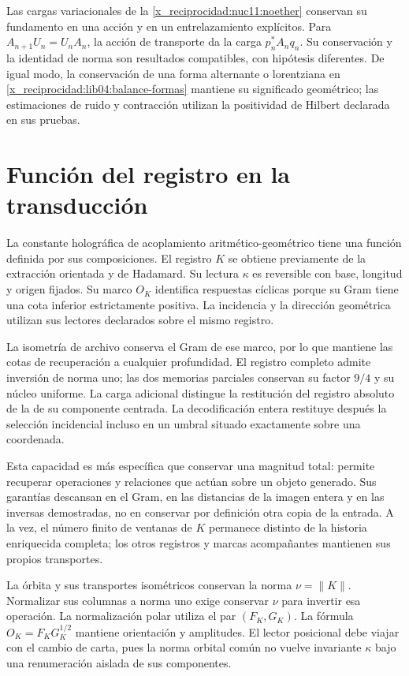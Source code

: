 Las cargas variacionales de la \cref{x_reciprocidad:nuc11:noether} conservan su
fundamento en una acción y en un entrelazamiento explícitos. Para
\(A_{n+1}U_n=U_nA_n\), la acción de transporte da la carga
\(p_n^*A_nq_n\). Su conservación y la identidad de norma son
resultados compatibles, con hipótesis diferentes. De igual modo,
la conservación de una forma alternante o lorentziana en
\eqref{x_reciprocidad:lib04:balance-formas} mantiene su significado geométrico;
las estimaciones de ruido y contracción utilizan la positividad
de Hilbert declarada en sus pruebas.

\section{Función del registro en la transducción}
\label{x_reciprocidad:lib06:registro}

La constante holográfica de acoplamiento aritmético-geométrico tiene
una función definida por sus composiciones. El registro \(K\)
se obtiene previamente de la extracción orientada y de Hadamard.
Su lectura \(\kappa\) es reversible con base, longitud y origen
fijados. Su marco \(O_K\) identifica respuestas cíclicas porque
su Gram tiene una cota inferior estrictamente positiva. La
incidencia y la dirección geométrica utilizan sus lectores
declarados sobre el mismo registro.

La isometría de archivo conserva el Gram de ese marco, por lo que
mantiene las cotas de recuperación a cualquier profundidad. El
registro completo admite inversión de norma uno; las dos memorias
parciales conservan su factor \(9/4\) y su núcleo uniforme. La
carga adicional distingue la restitución del registro absoluto de
la de su componente centrada. La decodificación entera restituye
después la selección incidencial incluso en un umbral situado
exactamente sobre una coordenada.

Esta capacidad es más específica que conservar una magnitud total:
permite recuperar operaciones y relaciones que actúan sobre un
objeto generado. Sus garantías descansan en el Gram, en las
distancias de la imagen entera y en las inversas demostradas, no
en conservar por definición otra copia de la entrada. A la vez,
el número finito de ventanas de \(K\) permanece distinto de la
historia enriquecida completa; los otros registros y marcas
acompañantes mantienen sus propios transportes.

La órbita y sus transportes isométricos conservan la norma
\(\nu=\|K\|\). Normalizar sus columnas a norma uno exige
conservar \(\nu\) para invertir esa operación. La normalización
polar utiliza el par
\((F_K,G_K)\). La fórmula
\(O_K=F_KG_K^{1/2}\) mantiene orientación y amplitudes.
El lector posicional debe viajar con el cambio de carta, pues la
norma orbital común no vuelve invariante \(\kappa\) bajo una
renumeración aislada de sus componentes.

